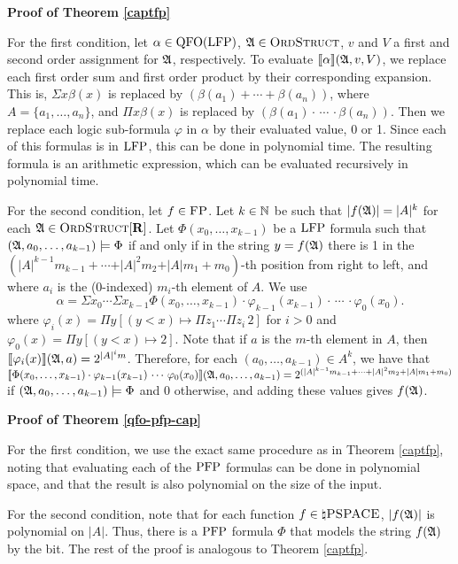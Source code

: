 \textbf{Proof of Theorem \ref{captfp}}

For the first condition, let $\alpha\in{\rm QFO}({\rm LFP})$, $\mathfrak{A}\in\text{\sc OrdStruct}$, $v$ and $V$ a first and second order assignment for $\mathfrak{A}$, respectively. To evaluate ${\llbracket{}{\alpha}\rrbracket}(\mathfrak{A},v,V)$, we replace each first order sum and first order product by their corresponding expansion. This is, $\Sigma x \beta(x)$ is replaced by $(\beta(a_1)+\cdots+\beta(a_n))$, where $A = \{a_1,\ldots,a_n\}$, and $\Pi x \beta(x)$ is replaced by $(\beta(a_1)\cdot\,\cdots\,\cdot\beta(a_n))$. Then we replace each logic sub-formula $\varphi$ in $\alpha$ by their evaluated value, 0 or 1. Since each of this formulas is in ${\rm LFP}$, this can be done in polynomial time. The resulting formula is an arithmetic expression, which can be evaluated recursively in polynomial time.
	
For the second condition, let $f\in \text{\sc FP}$. Let $k\in\mathbb{N}$ be such that $\vert f(\mathfrak{A}) \vert = \vert A \vert^k$ for each $\mathfrak{A}\in\text{\sc OrdStruct}[\mathbf{R}]$. Let $\Phi(x_0,\ldots,x_{k-1})$ be a ${\rm LFP}$ formula such that $(\mathfrak{A},a_0,\ldots,a_{k-1})\models\Phi$ if and only if in the string $y = f(\mathfrak{A})$ there is 1 in the $(\vert A \vert^{k-1}m_{k-1} + \cdots + \vert A \vert^2 m_2 + \vert A \vert m_1 + m_0)$-th position from right to left, and where $a_i$ is the (0-indexed) $m_i$-th element of $A$. We use
	$$
	\alpha = \Sigma x_0 \cdots \Sigma x_{k-1} \Phi(x_0,\ldots,x_{k-1})\cdot\varphi_{k-1}(x_{k-1})\cdot\,\cdots\,\cdot\varphi_0(x_0).
	$$
	where $\varphi_i(x) = \Pi y[(y < x)\mapsto\Pi z_1\cdots\Pi z_i\,2]$ for $i > 0$ and $\varphi_0(x) = \Pi y[(y < x)\mapsto 2]$. Note that if $a$ is the  $m$-th element in $A$, then ${\llbracket{}{\varphi_i(x)}\rrbracket}(\mathfrak{A},a) = 2^{\vert A \vert^i m}$. Therefore, for each $(a_0,\ldots,a_{k-1})\in A^k$, we have that ${\llbracket{}{\Phi(x_0,\ldots,x_{k-1})\cdot\varphi_{k-1}(x_{k-1})\,\cdots\,\varphi_0(x_0)}\rrbracket}(\mathfrak{A},a_0,\ldots,a_{k-1}) = 2^{(\vert A \vert^{k-1}m_{k-1} + \cdots + \vert A \vert^2 m_2 + \vert A \vert m_1 + m_0)}$ if $(\mathfrak{A},a_0,\ldots,a_{k-1})\models\Phi$ and 0 otherwise, and adding these values gives $f(\mathfrak{A})$. 	

\textbf{Proof of Theorem \ref{qfo-pfp-cap}}

For the first condition, we use the exact same procedure as in Theorem \ref{captfp}, noting that evaluating each of the ${\rm PFP}$ formulas can be done in polynomial space, and that the result is also polynomial on the size of the input.

For the second condition, note that for each function $f\in \natural\text{\sc PSPACE}$, $\vert f(\mathfrak{A}) \vert$ is polynomial on $\vert A \vert$. Thus, there is a ${\rm PFP}$ formula $\Phi$ that models the string $f(\mathfrak{A})$ by the bit. The rest of the proof is analogous to Theorem \ref{captfp}.

